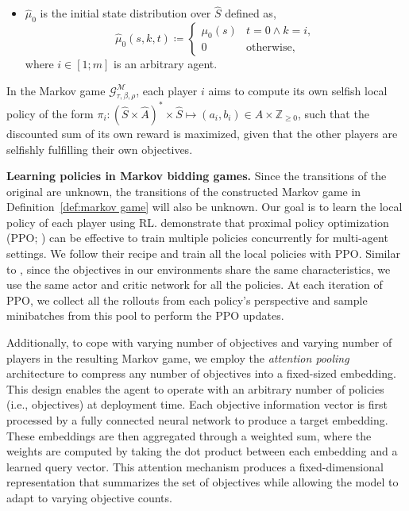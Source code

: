 \begin{definition}
\begin{itemize}
\begin{equation*}
\begin{cases}
                R_i(s, a_{k'}, s') & \text{otherwise}.
            \end{cases}
        \end{equation*}
        \item $\hat \mu_0$ is the initial state distribution over \(\hat S\) defined as,
        \begin{equation*}
        	\hat \mu_0(s,k,t) \coloneqq
        		\begin{cases}
        			\mu_0(s)	&	t=0 \land k=i, \\
        			0			&	\text{otherwise},
        		\end{cases}
        \end{equation*}
        where $i\in [1;m]$ is an arbitrary agent.
    \end{itemize}
\end{definition}

In the Markov game $\mathcal{G}^{\mathcal{M}}_{\tau,\beta,\rho}$, each player $i$ aims to compute its own selfish local policy of the form $\pi_i\colon (\hat{S}\times\hat{A})^*\times \hat{S}\mapsto (a_i,b_i)\in A\times \mathbb{Z}_{\geq 0}$, such that the discounted sum of its own reward is maximized, given that the other players are selfishly fulfilling their own objectives.

\textbf{Learning policies in Markov bidding games.}
Since the transitions of the original \momdp are unknown, the transitions of the constructed Markov game in Definition~\ref{def:markov game} will also be unknown.
Our goal is to learn the local policy of each player using RL.
\citet{yu2022mappo} demonstrate that proximal policy optimization (PPO; \cite{schulman2017ppo}) can be effective to train multiple policies concurrently for multi-agent settings. We follow their recipe and train all the local policies with PPO. 
Similar to \citet{yu2022mappo}, since the objectives in our environments share the same characteristics, we use the same actor and critic network for all the policies. 
At each iteration of PPO, we collect all the rollouts from each policy's perspective and sample minibatches from this pool to perform the PPO updates.

Additionally, to cope with varying number of objectives and varying number of players in the resulting Markov game, we employ the \textit{attention pooling} architecture to compress any number of objectives into a fixed-sized embedding. 
This design enables the agent to operate with an arbitrary number of policies (i.e., objectives) at deployment time. 
Each objective information vector is first processed by a fully connected neural network to produce a target embedding. 
These embeddings are then aggregated through a weighted sum, where the weights are computed by taking the dot product between each embedding and a learned query vector. 
This attention mechanism produces a fixed-dimensional representation that summarizes the set of objectives while allowing the model to adapt to varying objective counts.


